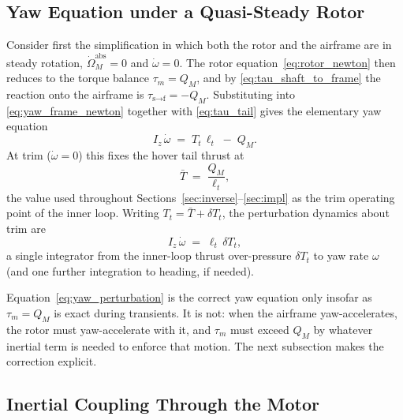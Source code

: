 \documentclass[11pt,a4paper]{article}
\newcommand{\Tt}{T_t}
\newcommand{\bT}{\bar{T}}
\begin{document}
\subsection{Yaw Equation under a Quasi-Steady Rotor}\label{ssec:yaw_constspeed}

Consider first the simplification in which both the rotor and the
airframe are in steady rotation, \(\dot\Omega_M^{\text{abs}}=0\)
and \(\dot\omega=0\). The rotor equation~\eqref{eq:rotor_newton}
then reduces to the torque balance \(\tau_m=Q_M\), and by
\eqref{eq:tau_shaft_to_frame} the reaction onto the airframe is
\(\tau_{\text{s}\to\text{f}}=-Q_M\). Substituting into
\eqref{eq:yaw_frame_newton} together with \eqref{eq:tau_tail} gives
the elementary yaw equation
\begin{equation}
I_z\,\dot\omega \;=\; \Tt\,\ell_t \;-\; Q_M.
\label{eq:yaw_constspeed}
\end{equation}
At trim (\(\dot\omega=0\)) this fixes the hover tail thrust at
\begin{equation}
\bT \;=\; \frac{Q_M}{\ell_t},
\label{eq:Tbar_from_QM}
\end{equation}
the value used throughout
Sections~\ref{sec:inverse}--\ref{sec:impl} as the trim operating
point of the inner loop. Writing \(\Tt=\bT+\delta\Tt\), the
perturbation dynamics about trim are
\begin{equation}
I_z\,\dot\omega \;=\; \ell_t\,\delta\Tt,
\label{eq:yaw_perturbation}
\end{equation}
a single integrator from the inner-loop thrust over-pressure
\(\delta\Tt\) to yaw rate \(\omega\) (and one further integration to
heading, if needed).

Equation~\eqref{eq:yaw_perturbation} is the correct yaw equation
only insofar as \(\tau_m=Q_M\) is exact during transients. It is
not: when the airframe yaw-accelerates, the rotor must
yaw-accelerate with it, and \(\tau_m\) must exceed \(Q_M\) by
whatever inertial term is needed to enforce that motion. The next
subsection makes the correction explicit.

\subsection{Inertial Coupling Through the Motor}\label{ssec:yaw_omega_coupling}
\end{document}
